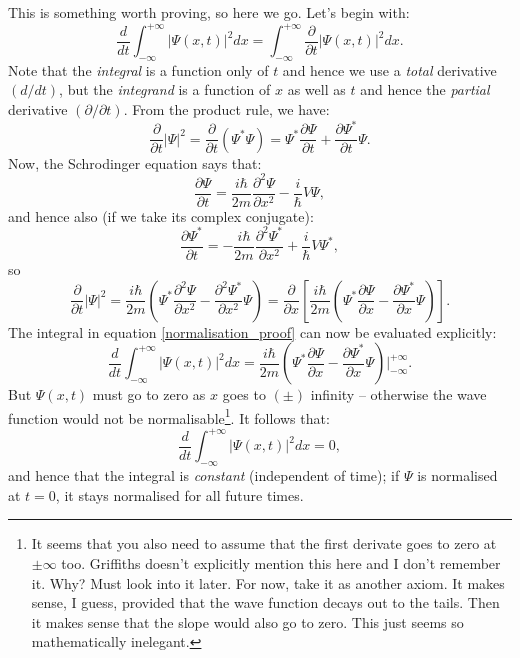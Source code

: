 \documentclass{article}
\begin{document}
This is something worth proving, so here we go. Let's begin with:
\begin{equation}
\label{normalisation_proof}
\frac{d}{dt}\int_{-\infty}^{+\infty} \left| \Psi (x,t) \right|^{2}dx =\int_{-\infty}^{+\infty} \frac{\partial}{\partial t}\left| \Psi (x,t) \right|^{2}dx.
\end{equation}
Note that the \emph{integral} is a function only of $t$ and hence we use a \emph{total} derivative $(d/dt)$, but the \emph{integrand} is a function of $x$ as well as $t$ and hence the \emph{partial} derivative $(\partial/\partial t)$. From the product rule, we have:
\begin{equation}
\frac{\partial}{\partial t} | \Psi |^{2} = \frac{\partial}{\partial t} \left( \Psi^{*}\Psi \right) = \Psi^{*}\frac{\partial \Psi}{\partial t} + \frac{\partial \Psi^{*}}{\partial t}\Psi.
\end{equation}
Now, the Schrodinger equation says that:
\begin{equation}
\frac{\partial \Psi}{\partial t} = \frac{i\hbar}{2m}\frac{\partial^{2}\Psi}{\partial x^{2}} - \frac{i}{\hbar}V\Psi,
\end{equation}
and hence also (if we take its complex conjugate):
\begin{equation}
\frac{\partial \Psi^{*}}{\partial t} = -\frac{i\hbar}{2m}\frac{\partial^{2}\Psi^{*}}{\partial x^{2}} + \frac{i}{\hbar}V\Psi^{*},
\end{equation}
so
\begin{equation}
\label{griffiths_125}
\frac{\partial}{\partial t}|\Psi |^{2} = \frac{i\hbar}{2m}\left( \Psi^{*}\frac{\partial^{2}\Psi}{\partial x^{2}} - \frac{\partial^{2}\Psi^{*}}{\partial x^{2}}\Psi \right) = \frac{\partial}{\partial x} \left[ \frac{i\hbar}{2m}\left( \Psi^{*}\frac{\partial \Psi}{\partial x} - \frac{\partial \Psi^{*}}{\partial x}\Psi \right) \right].
\end{equation}
The integral in equation \ref{normalisation_proof} can now be evaluated explicitly:
\begin{equation}
\frac{d}{dt}\int_{-\infty}^{+\infty}| \Psi (x,t) |^{2}dx = \frac{i\hbar}{2m}\left( \Psi^{*}\frac{\partial \Psi}{\partial x} - \frac{\partial \Psi^{*}}{\partial x}\Psi \right)\Big|_{-\infty}^{+\infty}.
\end{equation}
But $\Psi (x,t)$ must go to zero as $x$ goes to $(\pm)$ infinity -- otherwise the wave function would not be normalisable\footnote{It seems that you also need to assume that the first derivate goes to zero at $\pm \infty$ too. Griffiths doesn't explicitly mention this here and I don't remember it. Why? Must look into it later. For now, take it as another axiom. It makes sense, I guess, provided that the wave function decays out to the tails. Then it makes sense that the slope would also go to zero. This just seems so mathematically inelegant.}. It follows that:
\begin{equation}
\frac{d}{dt} \int_{-\infty}^{+\infty} | \Psi (x,t)|^{2} dx = 0,
\end{equation}
and hence that the integral is \emph{constant} (independent of time); if $\Psi$ is normalised at $t=0$, it stays normalised for all future times.
\end{document}
